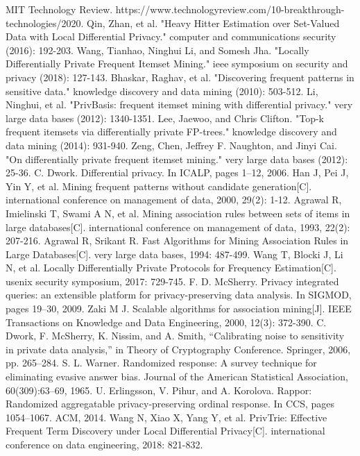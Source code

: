 \documentclass[conference]{IEEEtran}
\begin{document}
\begin{thebibliography}{00}
 MIT Technology Review. https://www.technologyreview.com/10-breakthrough-technologies/2020.
 Qin, Zhan, et al. "Heavy Hitter Estimation over Set-Valued Data with Local Differential Privacy." computer and communications security (2016): 192-203.
 Wang, Tianhao, Ninghui Li, and Somesh Jha. "Locally Differentially Private Frequent Itemset Mining." ieee symposium on security and privacy (2018): 127-143.
 Bhaskar, Raghav, et al. "Discovering frequent patterns in sensitive data." knowledge discovery and data mining (2010): 503-512.
 Li, Ninghui, et al. "PrivBasis: frequent itemset mining with differential privacy." very large data bases (2012): 1340-1351.
 Lee, Jaewoo, and Chris Clifton. "Top-k frequent itemsets via differentially private FP-trees." knowledge discovery and data mining (2014): 931-940.
 Zeng, Chen, Jeffrey F. Naughton, and Jinyi Cai. "On differentially private frequent itemset mining." very large data bases (2012): 25-36.
 C. Dwork. Differential privacy. In ICALP, pages 1–12, 2006.
 Han J, Pei J, Yin Y, et al. Mining frequent patterns without candidate generation[C]. international conference on management of data, 2000, 29(2): 1-12.
 Agrawal R, Imielinski T, Swami A N, et al. Mining association rules between sets of items in large databases[C]. international conference on management of data, 1993, 22(2): 207-216.
 Agrawal R, Srikant R. Fast Algorithms for Mining Association Rules in Large Databases[C]. very large data bases, 1994: 487-499.
 Wang T, Blocki J, Li N, et al. Locally Differentially Private Protocols for Frequency Estimation[C]. usenix security symposium, 2017: 729-745.
 F. D. McSherry. Privacy integrated queries: an extensible platform for privacy-preserving data
analysis. In SIGMOD, pages 19–30, 2009.
 Zaki M J. Scalable algorithms for association mining[J]. IEEE Transactions on Knowledge and Data Engineering, 2000, 12(3): 372-390.
 C. Dwork, F. McSherry, K. Nissim, and A. Smith, “Calibrating noise to sensitivity in private data analysis,” in Theory of Cryptography Conference. Springer, 2006, pp. 265–284.
 S. L. Warner. Randomized response: A survey technique for eliminating evasive answer bias. Journal of the American Statistical Association, 60(309):63–69, 1965.
 U. Erlingsson, V. Pihur, and A. Korolova. Rappor: Randomized aggregatable privacy-preserving ordinal response. In CCS, pages 1054–1067. ACM, 2014.
 Wang N, Xiao X, Yang Y, et al. PrivTrie: Effective Frequent Term Discovery under Local Differential Privacy[C]. international conference on data engineering, 2018: 821-832.



\end{thebibliography}
\end{document}

